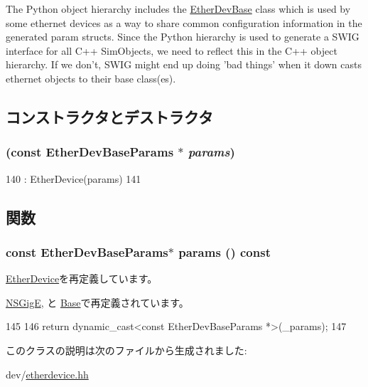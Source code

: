 The Python object hierarchy includes the \hyperlink{classEtherDevBase}{EtherDevBase} class which is used by some ethernet devices as a way to share common configuration information in the generated param structs. Since the Python hierarchy is used to generate a SWIG interface for all C++ SimObjects, we need to reflect this in the C++ object hierarchy. If we don't, SWIG might end up doing 'bad things' when it down casts ethernet objects to their base class(es). 

\subsection{コンストラクタとデストラクタ}
\hypertarget{classEtherDevBase_ab7264a855d427550154779e5d55eeab1}{
\subsubsection[{EtherDevBase}]{ (const EtherDevBaseParams $\ast$ {\em params})}}
\label{classEtherDevBase_ab7264a855d427550154779e5d55eeab1}



\begin{DoxyCode}
140         : EtherDevice(params)
141     {}
\end{DoxyCode}


\subsection{関数}
\hypertarget{classEtherDevBase_a24c177ef5d1124c3ff3e68a7e53532cf}{
\subsubsection[{params}]{\setlength{\rightskip}{0pt plus 5cm}const EtherDevBaseParams$\ast$ params () const}}
\label{classEtherDevBase_a24c177ef5d1124c3ff3e68a7e53532cf}


\hyperlink{classEtherDevice_acd3c3feb78ae7a8f88fe0f110a718dff}{EtherDevice}を再定義しています。

\hyperlink{classNSGigE_acd3c3feb78ae7a8f88fe0f110a718dff}{NSGigE}, と \hyperlink{classSinic_1_1Base_acd3c3feb78ae7a8f88fe0f110a718dff}{Base}で再定義されています。


\begin{DoxyCode}
145     {
146         return dynamic_cast<const EtherDevBaseParams *>(_params);
147     }
\end{DoxyCode}


このクラスの説明は次のファイルから生成されました:\begin{DoxyCompactItemize}
\item 
dev/\hyperlink{etherdevice_8hh}{etherdevice.hh}\end{DoxyCompactItemize}
